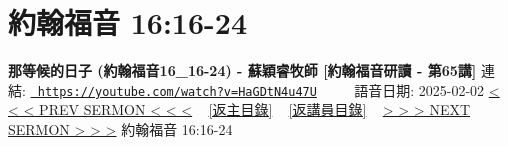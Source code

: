 \documentclass{book}
\begin{document}
\section{約翰福音 16:16-24}
\label{sec:HaGDtN4u47U}
\textbf{那等候的日子 (約翰福音16\_16-24) - 蘇穎睿牧師 [約翰福音研讀 - 第65講]}
\newline
\newline
連結: \href{https://youtube.com/watch?v=HaGDtN4u47U}{\texttt{ https://youtube.com/watch?v=HaGDtN4u47U}} ~~~~ 語音日期: 2025-02-02 
\newline
\newline
\hyperref[sec:M4alGuubf1o]{< < < PREV SERMON < < <}
~
\hyperlink{toc}{[返主目錄]}
~
\hyperref[ch:preacher9]{[返講員目錄]}
~
\hyperref[sec:fV_h6TniAkc]{> > > NEXT SERMON > > >}
\newline
\newline
約翰福音 16:16-24
\newline
\end{document}

